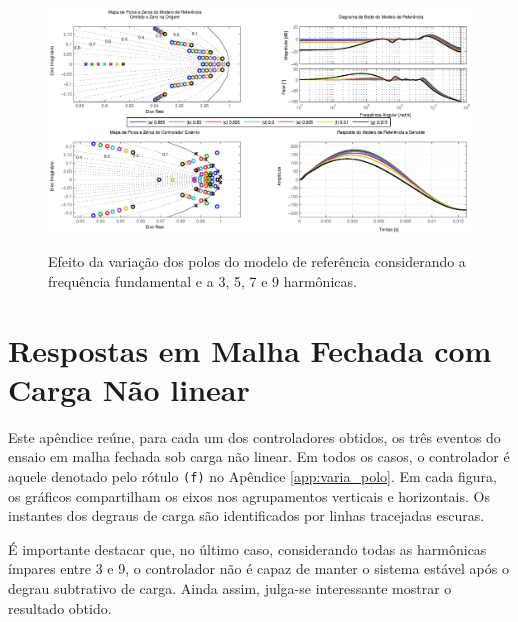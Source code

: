 \documentclass[repeatfields,oneside,overleaf]{tcc}
\begin{document}
\begin{figure}[!ht]
    \centering
    \caption{Efeito da variação dos polos do modelo de referência considerando a frequência fundamental e a 3{\textordfeminine}, 5{\textordfeminine}, 7{\textordfeminine} e 9{\textordfeminine} harmônicas.}
    \includegraphics[trim={80 20 80 10}, clip, width=\linewidth]{fig/f_9.eps}
    \\
\end{figure}

\chapter{Respostas em Malha Fechada com Carga Não linear}\label{app:respostas}

Este apêndice reúne, para cada um dos controladores obtidos, os três eventos do ensaio em malha fechada sob carga não linear.
Em todos os casos, o controlador é aquele denotado pelo rótulo \texttt{(f)} no Apêndice \ref{app:varia_polo}.
Em cada figura, os gráficos compartilham os eixos nos agrupamentos verticais e horizontais.
Os instantes dos degraus de carga são identificados por linhas tracejadas escuras.

É importante destacar que, no último caso, considerando todas as harmônicas ímpares entre 3 e 9, o controlador não é capaz de manter o sistema estável após o degrau subtrativo de carga.
Ainda assim, julga-se interessante mostrar o resultado obtido.
\end{document}
